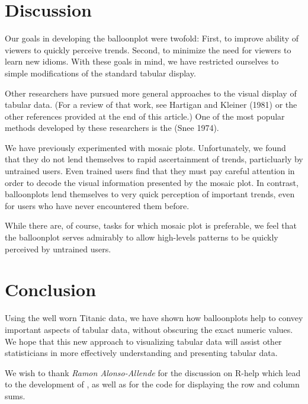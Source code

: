 \documentclass[a4paper]{report}
\begin{document}
\begin{article}
\section*{Discussion}

Our goals in developing the balloonplot were twofold: First, to
improve ability of viewers to quickly perceive trends. Second, to
minimize the need for viewers to learn new idioms.  With these goals
in mind, we have restricted ourselves to simple modifications of the
standard tabular display.  

Other researchers have pursued more general approaches to the visual
display of tabular data. (For a review of that work, see Hartigan
and Kleiner (1981) or the other references provided at the end of
this article.)  One of the most popular methods developed by these
researchers is the  (Snee 1974).

We have previously experimented with mosaic plots.  Unfortunately,
we found that they do not lend themselves to rapid ascertainment of
trends, particluarly by untrained users.  Even trained users find
that they must pay careful attention in order to decode the visual
information presented by the mosaic plot.  In contrast, balloonplots
lend themselves to very quick perception of important trends, even
for users who have never encountered them before.

While there are, of course, tasks for which mosaic plot is
preferable, we feel that the balloonplot serves admirably to allow
high-levels patterns to be quickly perceived by untrained users.

\section*{Conclusion}

Using the well worn Titanic data, we have shown how balloonplots
help to convey important aspects of tabular data, without obscuring
the exact numeric values.  We hope that this new approach to
visualizing tabular data will assist other statisticians in more
effectively understanding and presenting tabular data.


We wish to thank \emph{Ramon Alonso-Allende}
 for the discussion on R-help which lead
to the development of , as well as for the code
for displaying the row and column sums.

\address{Gregory R. Warnes, Pfizer Inc., USA\\
\\
       Nitin Jain, Smith Hanley Inc, USA\\
}

\end{article}
\end{document}
